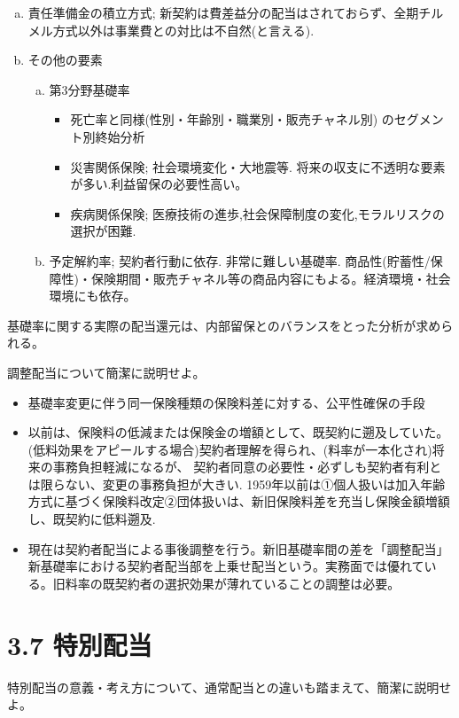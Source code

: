 \documentclass[report,gutter=10mm,fore-edge=10mm,uplatex,dvipdfmx]{jlreq}
\begin{document}
\begin{enumerate} [(1)]
\begin{enumerate}[(a)]
既契約にも経営効率化の効果は享受されるべきで、保険金額ランク別費差配当は一つの解決策。
 \item 責任準備金の積立方式; 新契約は費差益分の配当はされておらず、全期チルメル方式以外は事業費との対比は不自然(と言える).  
 \item その他の要素
\begin{enumerate} [(a)]
 \item 第3分野基礎率
\begin{itemize}
 \item 死亡率と同様(性別・年齢別・職業別・販売チャネル別) のセグメント別終始分析
 \item 災害関係保険; 社会環境変化・大地震等. 将来の収支に不透明な要素が多い.利益留保の必要性高い。
 \item 疾病関係保険; 医療技術の進歩,社会保障制度の変化,モラルリスクの選択が困難.  
\end{itemize}
 \item 予定解約率;  契約者行動に依存. 非常に難しい基礎率. 商品性(貯蓄性/保障性)・保険期間・販売チャネル等の商品内容にもよる。経済環境・社会環境にも依存。
\end{enumerate}
\end{enumerate}
\end{enumerate}

基礎率に関する実際の配当還元は、内部留保とのバランスをとった分析が求められる。

調整配当について簡潔に説明せよ。
\begin{itemize}
 \item 基礎率変更に伴う同一保険種類の保険料差に対する、公平性確保の手段
 \item 以前は、保険料の低減または保険金の増額として、既契約に遡及していた。
(低料効果をアピールする場合)契約者理解を得られ、(料率が一本化され)将来の事務負担軽減になるが、
契約者同意の必要性・必ずしも契約者有利とは限らない、変更の事務負担が大きい. 
1959年以前は①個人扱いは加入年齢方式に基づく保険料改定②団体扱いは、新旧保険料差を充当し保険金額増額し、既契約に低料遡及.
 \item 現在は契約者配当による事後調整を行う。新旧基礎率間の差を「調整配当」新基礎率における契約者配当部を上乗せ配当という。実務面では優れている。旧料率の既契約者の選択効果が薄れていることの調整は必要。
\end{itemize}
\section{3.7 特別配当}
特別配当の意義・考え方について、通常配当との違いも踏まえて、簡潔に説明せよ。
\end{document}
